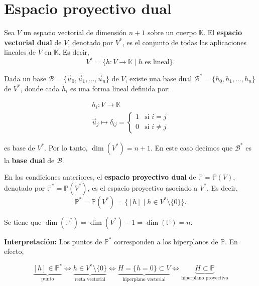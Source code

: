\section{Espacio proyectivo dual}

\begin{definición} 
    Sea $V$ un espacio vectorial de dimensión $n+1$ sobre un cuerpo $\mathbb{K}$. El \textbf{espacio vectorial dual} de $V$, denotado por $V^*$, es el conjunto de todas las aplicaciones lineales de $V$ en $\mathbb{K}$. Es decir,
    \[
        V^* = \{ h : V \to \mathbb{K} \mid h \text{ es lineal} \}.
    \]
\end{definición}

Dada un base $\mathcal{B} = \{ \vec{u}_0, \vec{u}_1, \ldots, \vec{u}_n \}$ de $V$, existe una base dual $\mathcal{B}^* = \{ h_0, h_1, \ldots, h_n \}$ de $V^*$, donde cada $h_i$ es una forma lineal definida por:

\[
    \begin{matrix}
        h_i : V  \to  \mathbb{K} \\
        \vec{u}_j  \mapsto  \delta_{ij} =
        \begin{cases}
            1 & \text{si } i = j \\
            0 & \text{si } i \neq j
        \end{cases}
    \end{matrix}
\]

es base de $V^*$. Por lo tanto, $\dim(V^*) = n+1$. En este caso decimos que $\mathcal{B}^*$ es la \textbf{base dual} de $\mathcal{B}$.

\begin{definición} 
    En las condiciones anteriores, el \textbf{espacio proyectivo dual} de $\mathbb{P}=\mathbb{P}(V)$, denotado por $\mathbb{P}^*=\mathbb{P}(V^*)$, es el espacio proyectivo asociado a $V^*$. Es decir,
    \[
        \mathbb{P}^* = \mathbb{P}(V^*) = \{ [h] \mid h \in V^* \setminus \{0\} \}.
    \]
\end{definición}

Se tiene que $\dim(\mathbb{P}^*) = \dim(V^*) - 1 = \dim(\mathbb{P}) = n$.

\textbf{Interpretación:} Los puntos de $\mathbb{P}^*$ corresponden a los hiperplanos de $\mathbb{P}$. En efecto,

\[
    \underbrace{[h] \in \mathbb{P}^*}_{\text{punto}} \iff \underbrace{h \in V^* \setminus \{0\}}_{\text{recta vectorial}} \iff \underbrace{H = \{h = 0\} \subset V}_{\text{hiperplano vectorial}} \iff \underbrace{H \subset \mathbb{P}}_{\text{hiperplano proyectivo}}
\]

